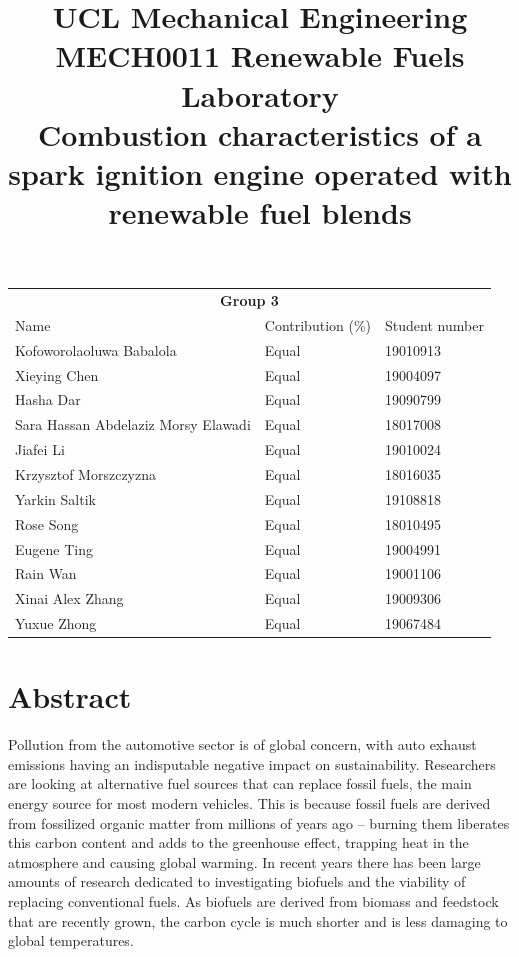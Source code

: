 \documentclass[11pt]{article}
\begin{document}
\title{\textbf{UCL Mechanical Engineering}\\MECH0011 Renewable Fuels Laboratory\\
Combustion characteristics of a spark ignition engine operated with renewable fuel blends}
\maketitle
\begin{table}[H]
    \begin{center}
    \begin{tabular}{@{}l l l@{}}
        \toprule
        \multicolumn{3}{c}{\textbf{Group 3}}\\
        Name & Contribution (\%) & Student number\\
        \midrule
        Kofoworolaoluwa Babalola  & Equal & 19010913\\
        Xieying Chen & Equal & 19004097\\
        Hasha Dar & Equal & 19090799\\
        Sara Hassan Abdelaziz Morsy Elawadi & Equal & 18017008\\
        Jiafei Li & Equal & 19010024\\
        Krzysztof Morszczyzna & Equal & 18016035\\
        Yarkin Saltik & Equal & 19108818\\
        Rose Song & Equal & 18010495\\
        Eugene Ting & Equal & 19004991\\
        Rain Wan & Equal & 19001106\\
        Xinai Alex Zhang & Equal & 19009306\\
        Yuxue Zhong & Equal & 19067484\\
        \bottomrule
    \end{tabular}
\end{center}
\end{table}
\newpage
\tableofcontents
\listoffigures
\listoftables
\section{Abstract}
Pollution from the automotive sector is of global concern, with auto exhaust emissions having an indisputable negative impact on sustainability. Researchers are looking at alternative fuel sources that can replace fossil fuels, the main energy source for most modern vehicles. This is because fossil fuels are derived from fossilized organic matter from millions of years ago – burning them liberates this carbon content and adds to the greenhouse effect, trapping heat in the atmosphere and causing global warming. In recent years there has been large amounts of research dedicated to investigating biofuels and the viability of replacing conventional fuels. As biofuels are derived from biomass and feedstock that are recently grown, the carbon cycle is much shorter and is less damaging to global temperatures. 
\end{document}

